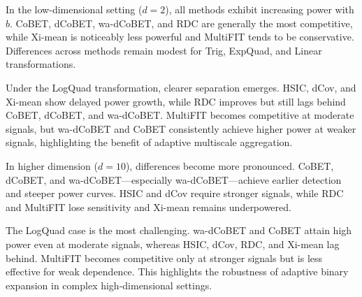 \documentclass[12pt,reqno,oneside]{amsbook}
\theoremstyle{definition}
\theoremstyle{remark}
\begin{document}

In the low-dimensional setting ($d=2$), all methods exhibit increasing power
with $b$. CoBET, dCoBET, wa-dCoBET, and RDC are generally the most competitive,
while Xi-mean is noticeably less powerful and MultiFIT tends to be conservative.
Differences across methods remain modest for Trig, ExpQuad, and Linear
transformations.


Under the LogQuad transformation, clearer separation emerges. HSIC, dCov, and
Xi-mean show delayed power growth, while RDC improves but still lags behind
CoBET, dCoBET, and wa-dCoBET. MultiFIT becomes competitive at moderate signals,
but wa-dCoBET and CoBET consistently achieve higher power at weaker signals,
highlighting the benefit of adaptive multiscale aggregation.

In higher dimension ($d=10$), differences become more pronounced. CoBET,
dCoBET, and wa-dCoBET---especially wa-dCoBET---achieve earlier detection and
steeper power curves. HSIC and dCov require stronger signals, while RDC and
MultiFIT lose sensitivity and Xi-mean remains underpowered.

The LogQuad case is the most challenging. wa-dCoBET and CoBET attain high power
even at moderate signals, whereas HSIC, dCov, RDC, and Xi-mean lag behind.
MultiFIT becomes competitive only at stronger signals but is less effective for
weak dependence. This highlights the robustness of adaptive binary expansion in
complex high-dimensional settings.

\end{document}
